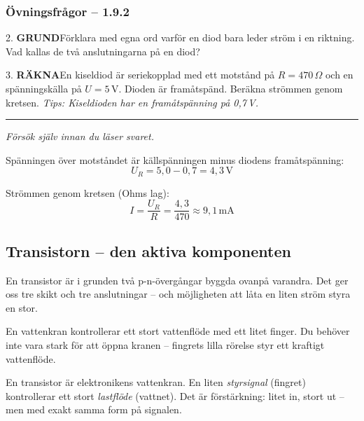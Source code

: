 \documentclass[a4paper,11pt,twoside]{book}
\newcommand{\emoji}[1]{{\emojifont #1}}
\newcommand{\qgrund}{\colorbox{greenpale}{\textcolor{greendark}{\headingfont\bfseries\tiny GRUND}}}
\newcommand{\qrakna}{\colorbox{bluepale}{\textcolor{bluedark}{\headingfont\bfseries\tiny RÄKNA}}}
\begin{document}
\subsubsection*{Övningsfrågor -- 1.9.2}

\begin{qblock}{2.}
\qgrund\quad Förklara med egna ord varför en diod bara leder
ström i en riktning. Vad kallas de två anslutningarna på en diod?
\end{qblock}

\begin{qblock}{3.}
\qrakna\quad En kiseldiod är seriekopplad med ett motstånd på
$R = 470\,\Omega$ och en spänningskälla på $U = 5\,\text{V}$.
Dioden är framåtspänd. Beräkna strömmen genom kretsen.
\emph{Tips: Kiseldioden har en framåtspänning på 0,7\,V.}
\end{qblock}

\medskip
\noindent\rule{\textwidth}{0.4pt}
{\small\itshape Försök själv innan du läser svaret.}
\medskip

\begin{worked}[title={Lösning -- Räkneexempel 1.9.2}]
Spänningen över motståndet är källspänningen minus diodens
framåtspänning:
\[ U_R = 5{,}0 - 0{,}7 = 4{,}3\,\text{V} \]

Strömmen genom kretsen (Ohms lag):
\[ I = \frac{U_R}{R} = \frac{4{,}3}{470} \approx 9{,}1\,\text{mA} \]
\end{worked}

\subsection{Transistorn -- den aktiva komponenten}

En transistor är i grunden två p-n-övergångar byggda ovanpå
varandra. Det ger oss tre skikt och tre anslutningar -- och
möjligheten att låta en liten ström styra en stor.

\begin{storybox}[{\emoji{🚰} Vattenkranen}]
En vattenkran kontrollerar ett stort vattenflöde med ett litet
finger. Du behöver inte vara stark för att öppna kranen --
fingrets lilla rörelse styr ett kraftigt vattenflöde.

En transistor är elektronikens vattenkran. En liten \emph{styrsignal}
(fingret) kontrollerar ett stort \emph{lastflöde} (vattnet).
Det är förstärkning: litet in, stort ut -- men med exakt samma
form på signalen.
\end{storybox}
\end{document}
